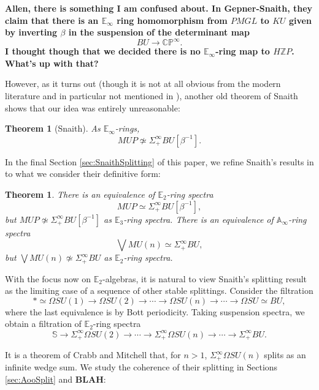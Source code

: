 \documentclass[reqno, oneside]{amsart}
\theoremstyle{definition}
\theoremstyle{plain}
\newtheorem{thm}[nul]{Theorem}
\begin{document}
\textbf{Allen, there is something I am confused about.  In Gepner-Snaith, they claim that there is an $\mathbb{E}_\infty$ ring homomorphism from $PMGL$ to $KU$ given by inverting $\beta$ in the suspension of the determinant map
$$BU \rightarrow \mathbb{CP}^{\infty}.$$
I thought though that we decided there is no $\mathbb{E}_\infty$-ring map to $H\mathbb{Z}P$.  What's up with that?}

However, as it turns out (though it is not at all obvious from the modern literature and in particular not mentioned in \cite{GepnerSnaith}), another old theorem of Snaith \cite{SnaithNotMultiplicative} shows that our idea was entirely unreasonable:

\begin{thm}[Snaith]
As $\mathbb{E}_\infty$-rings,
$$MUP \not \simeq \Sigma^{\infty}_+ BU[\beta^{-1}].$$
\end{thm}

In the final Section \ref{sec:SnaithSplitting} of this paper, we refine Snaith's results in to what we consider their definitive form:

\begin{thm}
There is an equivalence of $\mathbb{E}_2$-ring spectra
$$MUP \simeq \Sigma^{\infty}_+ BU[\beta^{-1}],$$
but $MUP \not \simeq \Sigma^{\infty}_+ BU[\beta^{-1}]$ as $\mathbb{E}_3$-ring spectra.  There is an equivalence of $\mathbb{A}_\infty$-ring spectra
$$\bigvee MU(n) \simeq \Sigma^{\infty}_+ BU,$$
but $\bigvee MU(n) \not \simeq \Sigma^{\infty}_+ BU$ as $\mathbb{E}_2$-ring spectra.
\end{thm}

With the focus now on $\mathbb{E}_2$-algebras, it is natural to view Snaith's splitting result as the limiting case of a sequence of other stable splittings.  Consider the filtration
$$* \simeq \Omega SU(1) \longrightarrow \Omega SU(2) \longrightarrow \cdots \longrightarrow \Omega SU(n) \longrightarrow \cdots \longrightarrow \Omega SU \simeq BU,$$
where the last equivalence is by Bott periodicity.  Taking suspension spectra, we obtain a filtration of $\mathbb{E}_2$-ring spectra
$$\mathbb{S} \longrightarrow \Sigma^{\infty}_+ \Omega SU(2) \longrightarrow \cdots \longrightarrow \Sigma^{\infty}_+ \Omega SU(n) \longrightarrow \cdots \longrightarrow \Sigma^{\infty}_+ BU.$$

It is a theorem of Crabb and Mitchell \cite{CrabbMitchell} that, for $n>1$, $\Sigma^{\infty}_+ \Omega SU(n)$ splits as an infinite wedge sum.  We study the coherence of their splitting in Sections \ref{sec:AooSplit} and \textbf{BLAH}:
\end{document}
